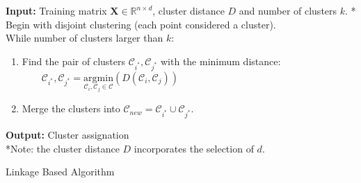 \documentclass{article}
\begin{document}
\begin{algorithm}[H]
\SetAlgoLined
\textbf{Input:} Training matrix $\mathbf{X}\in\mathbb{R}^{n\times d}$, cluster distance $D$ and number of clusters $k$. * \\
Begin with disjoint clustering (each point considered a cluster). \\
\vspace{2mm}
While number of clusters larger than $k$:
\begin{enumerate}
\item Find the pair of clusters $\mathcal{C}_{i^*}, \mathcal{C}_{j^*}$ with the minimum distance:\\
        $\qquad \mathcal{C}_{i^*}, \mathcal{C}_{j^*} =\underset{\mathcal{C}_{i}, \mathcal{C}_{j} \in \mathcal{C}}{\text{argmin}}
        \left(D(\mathcal{C}_{i},\mathcal{C}_{j})\right)$
\item Merge the clusters into $\mathcal{C}_{new}=\mathcal{C}_{i^*}\cup \mathcal{C}_{j^*}$.
\end{enumerate}
\textbf{Output:} Cluster assignation \\
*Note: the cluster distance $D$ incorporates the selection of $d$.
\caption{Linkage Based Algorithm}
\end{algorithm}
\end{document}
